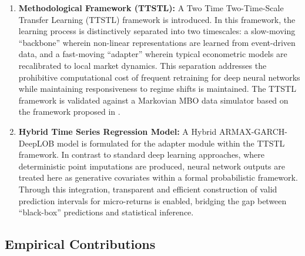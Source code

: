 \documentclass[10pt,a4paper,oneside]{article}
\providecommand{\DIFaddtex}[1]{{\protect\color{blue} \sf #1}} %
\providecommand{\DIFdeltex}[1]{{\protect\color{red} \scriptsize #1}} %
\providecommand{\DIFaddbegin}{} %
\providecommand{\DIFaddend}{} %
\providecommand{\DIFdelbegin}{} %
\providecommand{\DIFdelend}{} %
\providecommand{\DIFadd}[1]{\texorpdfstring{\DIFaddtex{#1}}{#1}} %
\providecommand{\DIFdel}[1]{\texorpdfstring{\DIFdeltex{#1}}{}} %
\newcommand{\DIFscaledelfig}{0.5}
\newlength{\DIFdelgraphicswidth} %
\newlength{\DIFdelgraphicsheight} %
\newcommand{\DIFaddincludegraphics}[2][]{{\color{blue}\fbox{\DIFOincludegraphics[#1]{#2}}}} %
\newcommand{\DIFdelincludegraphics}[2][]{%
\sbox{\DIFdelgraphicsbox}{\DIFOincludegraphics[#1]{#2}}%
\settoboxwidth{\DIFdelgraphicswidth}{\DIFdelgraphicsbox} %
\settoboxtotalheight{\DIFdelgraphicsheight}{\DIFdelgraphicsbox} %
\scalebox{\DIFscaledelfig}{%
\parbox[b]{\DIFdelgraphicswidth}{\usebox{\DIFdelgraphicsbox}\\[-\baselineskip] \rule{\DIFdelgraphicswidth}{0em}}\llap{\resizebox{\DIFdelgraphicswidth}{\DIFdelgraphicsheight}{%
\setlength{\unitlength}{\DIFdelgraphicswidth}%
\begin{picture}(1,1)%
\thicklines\linethickness{2pt} %
{\color[rgb]{1,0,0}\put(0,0){\framebox(1,1){}}}%
{\color[rgb]{1,0,0}\put(0,0){\line( 1,1){1}}}%
{\color[rgb]{1,0,0}\put(0,1){\line(1,-1){1}}}%
\end{picture}%
}\hspace*{3pt}}} %
} %
\DeclareRobustCommand{\DIFaddbegin}{\DIFOaddbegin \let\includegraphics\DIFaddincludegraphics} %
\DeclareRobustCommand{\DIFaddend}{\DIFOaddend \let\includegraphics\DIFOincludegraphics} %
\DeclareRobustCommand{\DIFdelbegin}{\DIFOdelbegin \let\includegraphics\DIFdelincludegraphics} %
\DeclareRobustCommand{\DIFdelend}{\DIFOaddend \let\includegraphics\DIFOincludegraphics} %
\begin{document}
\begin{enumerate}
    \item \textbf{Methodological Framework (TTSTL):} A \DIFdelbegin \DIFdel{Two Time }\DIFdelend \DIFaddbegin \DIFadd{Two-Time-Scale }\DIFaddend Transfer Learning (TTSTL) framework is introduced. In this framework, the learning process is distinctively separated into two timescales: a slow-moving ``backbone'' wherein non-linear representations are learned from event-driven data, and a fast-moving ``adapter'' wherein typical econometric models are recalibrated to local market dynamics. This separation addresses the prohibitive computational cost of frequent retraining for deep neural networks while \DIFaddbegin \DIFadd{maintaining }\DIFaddend responsiveness to regime shifts\DIFdelbegin \DIFdel{is maintained}\DIFdelend . The TTSTL framework is validated against a Markovian MBO data simulator based on the framework proposed in \cite{cont2023mathematical}.

    \item \textbf{Hybrid Time Series Regression Model:} A Hybrid ARMAX-GARCH-DeepLOB model is formulated for the adapter module within the TTSTL framework. In contrast to standard deep learning approaches, where deterministic point imputations are produced, neural network outputs are treated here as generative covariates within a formal probabilistic framework. Through this integration, transparent and efficient construction of valid prediction intervals for micro-returns is enabled, bridging the gap between ``black-box'' predictions and statistical inference.
\end{enumerate}

\subsection{Empirical Contributions}
\end{document}
